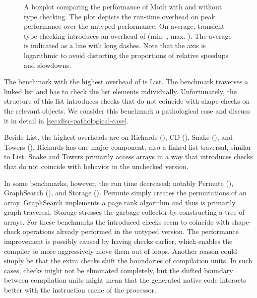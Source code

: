 \begin{figure}[htb]
  \centering
	\TypingOverhead{}
	\caption{A boxplot comparing the performance of Moth
  with and without type checking.
  The plot depicts the run-time overhead on peak performance over
  the untyped performance. On average, transient type checking introduces
  an overhead of \OverheadTypingGMeanP (min. \OverheadTypingMinP, max. \OverheadTypingMaxP).
  The average is indicated as a line with long dashes.
  Note that the axis is logarithmic to avoid distorting the proportions
  of relative speedups and slowdowns.
  }
	\label{fig:typing-overhead}
\end{figure}


The benchmark with the highest overhead of \OverheadListP is List.
The benchmark traverses a linked list and
has to check the list elements individually.
Unfortunately, the structure of this list introduces checks
that do not coincide with shape checks on the relevant objects.
We consider this benchmark a pathological case and discuss it
in detail in \cref{sec:disc-pathological-case}.

Beside List, the highest overheads are on
Richards (\OverheadRichardsP), CD (\OverheadCDP),
Snake (\OverheadSnakeP), and Towers (\OverheadTowersP).
Richards has one major component, also a linked list traversal,
similar to List.
Snake and Towers primarily access arrays in a way that introduces checks
that do not coincide with behavior in the unchecked version.


In some benchmarks, however, the run time decreased; notably Permute (\OverheadPermuteP),
GraphSearch (\OverheadGraphSearchP), and Storage (\OverheadStorageP).
Permute simply creates the permutations of an array.
GraphSearch implements a page rank algorithm
and thus is primarily graph traversal.
Storage stresses the garbage collector by constructing a tree of arrays.
For these benchmarks the introduced checks seem to coincide with shape-check operations
already performed in the untyped version.
The performance improvement is possibly caused by having checks earlier,
which enables the compiler to more aggressively move them out of loops.
Another reason could simply be that the extra checks shift the boundaries
of compilation units.
In such cases, checks might not be eliminated completely,
but the shifted boundary between compilation units might mean that
the generated native code interacts better with
the instruction cache of the processor.

